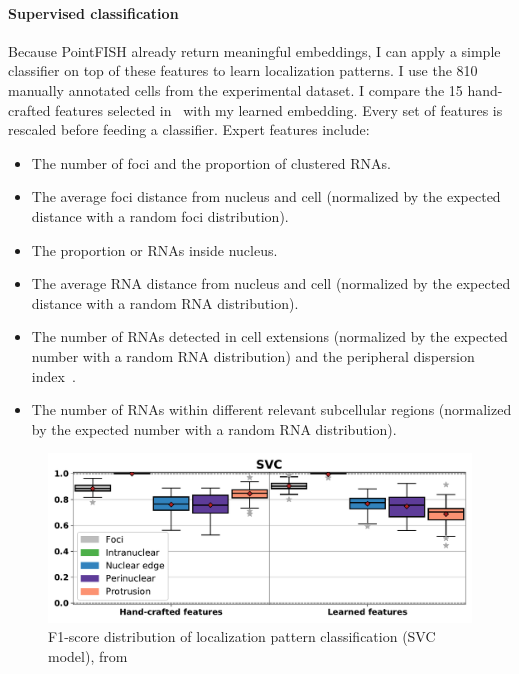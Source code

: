 \paragraph{Supervised classification}

Because PointFISH already return meaningful embeddings, I can apply a simple classifier on top of these features to learn localization patterns.
I use the 810 manually annotated cells from the experimental dataset.
I compare the 15 hand-crafted features selected in~\cite{CHOUAIB_2020} with my learned embedding.
Every set of features is rescaled before feeding a classifier.
Expert features include:

\begin{itemize}
	\setlength\itemsep{0.1em}
	\item The number of foci and the proportion of clustered \ac{RNA}s.
	\item The average foci distance from nucleus and cell (normalized by the expected distance with a random foci distribution).
	\item The proportion or \ac{RNA}s inside nucleus.
	\item The average \ac{RNA} distance from nucleus and cell (normalized by the expected distance with a random \ac{RNA} distribution).
	\item The number of \ac{RNA}s detected in cell extensions (normalized by the expected number with a random \ac{RNA} distribution) and the peripheral dispersion index~\cite{stueland_rdi_2019}.
	\item The number of \ac{RNA}s within different relevant subcellular regions (normalized by the expected number with a random \ac{RNA} distribution).
\end{itemize}

\begin{figure}[]
    \centering
	\includegraphics[clip, trim=0cm 0cm 0cm 1cm, width=\textwidth]{figures/chapter4/f1_SVC}
    \caption[F1-score distribution with hand-crafted and learned features]{F1-score distribution of localization pattern classification (SVC model), from~\cite{pointfish_2022}}
    \label{fig:f1_SVC_real}
\end{figure}

